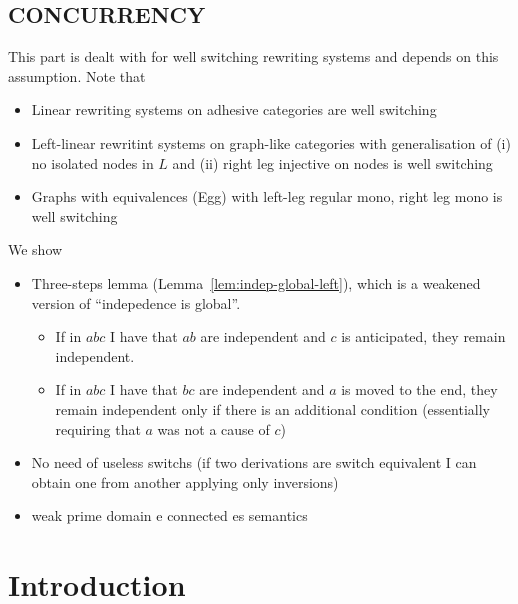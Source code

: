 \documentclass[a4paper,UKenglish,cleveref,pdftex,thm-restate,numberwithinsect,anonymous]{lipics}
\begin{document}
\subsection*{CONCURRENCY}

This part is dealt with for well switching rewriting systems and depends on this assumption. Note that
\begin{itemize}
\item Linear rewriting systems on adhesive categories are well switching
\item Left-linear rewritint systems on graph-like categories with generalisation of (i) no isolated nodes in $L$ and (ii) right leg injective on nodes is well switching
\item Graphs with equivalences (Egg) with left-leg regular mono, right leg mono is well switching
\end{itemize}

We show
\begin{itemize}
  

\item Three-steps lemma (Lemma~\ref{lem:indep-global-left}), which is a weakened version of ``indepedence is global''.
  \begin{itemize}
    
  \item If in $abc$ I have that $ab$ are independent and $c$ is anticipated, they remain independent.
  \item  If in $abc$ I have that $bc$ are independent and $a$ is moved to the end, they remain independent only if there is an additional condition (essentially requiring that $a$ was not a cause of $c$)
  \end{itemize}

  
  
\item No need of useless switchs (if two derivations are switch equivalent I can obtain one from another applying only inversions)
  
\item weak prime domain e connected es semantics
\end{itemize}
\fi

\section{Introduction}

%
\end{document}
